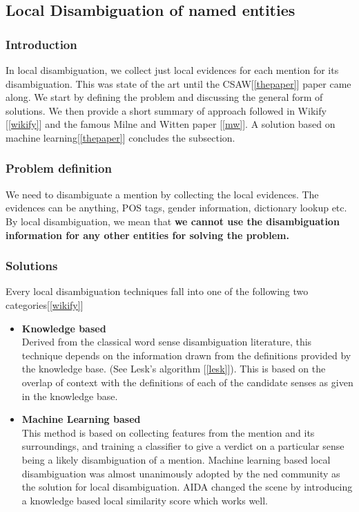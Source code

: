 \subsection{Local Disambiguation of named entities}
\subsubsection{Introduction}
In local disambiguation, we collect just local evidences for each 
mention for its disambiguation. This was state of the art until the CSAW[\ref{thepaper}]
paper came along. We start by defining the problem and discussing the general form of solutions.
We then provide a short summary of approach followed in Wikify [\ref{wikify}] and the famous Milne and Witten paper [\ref{mw}]. A
solution based on machine learning[\ref{thepaper}] concludes the subsection.

\subsubsection{Problem definition}
We need to disambiguate a mention by collecting the local evidences. 
The evidences can be anything, POS tags, gender information, dictionary lookup 
etc. By local disambiguation, we mean that \textbf{we cannot use the disambiguation
information for any other entities for solving the problem.} 

\subsubsection{Solutions}

Every local disambiguation techniques fall into one of the following two categories[\ref{wikify}]

\begin{itemize}
 \item \textbf{Knowledge based} \\
 Derived from the classical word sense disambiguation literature, this 
 technique depends on the information drawn from the definitions provided by the knowledge base. 
 (See Lesk's algorithm [\ref{lesk}]).
 This is based on the overlap of context with the definitions of each of the candidate 
 senses as given in the knowledge base.
 
 \item \textbf{Machine Learning based} \\
 This method is based on collecting features from the mention and its surroundings, and
 training a classifier to give a verdict on a particular sense being a likely disambiguation
 of a mention. Machine learning based local disambiguation was almost unanimously adopted
 by the ned community as the solution for local disambiguation. AIDA changed the scene 
 by introducing a knowledge based local similarity score which works well.
 
 \end{itemize}

